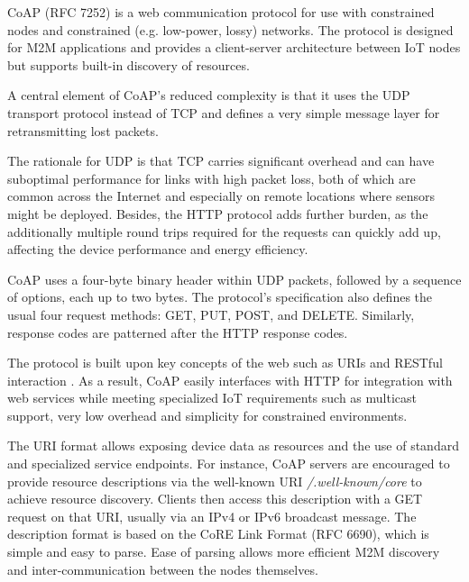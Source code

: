 CoAP \cite{bormann2012coap} (RFC 7252) is a web communication protocol for use with constrained nodes and constrained (e.g. low-power, lossy) networks. The protocol is designed for M2M applications and provides a client-server architecture between IoT nodes but supports built-in discovery of resources.

A central element of CoAP's reduced complexity is that it uses the UDP transport protocol instead of TCP and defines a very simple message layer for retransmitting lost packets. {\color{red}
The rationale for UDP is that TCP carries significant overhead and can have suboptimal performance for links with high packet loss, both of which are common across the Internet \cite{nygren2010akamai} and especially on remote locations where sensors might be deployed. Besides, the HTTP protocol adds further burden, as the additionally multiple round trips required for the requests can quickly add up, affecting the device performance and energy efficiency.

CoAP uses a four-byte binary header within UDP packets, followed by a sequence of options, each up to two bytes. The protocol's specification also defines the usual four request methods: GET, PUT, POST, and DELETE. Similarly, response codes are patterned after the HTTP response codes.
}

The protocol is built upon key concepts of the web such as URIs and RESTful interaction \cite{pereira2013enabling}. As a result, CoAP easily interfaces with HTTP for integration with web services while meeting specialized IoT requirements such as multicast support, very low overhead and simplicity for constrained environments. 

The URI format allows exposing device data as resources and the use of standard and specialized service endpoints. For instance, CoAP servers are encouraged to provide resource descriptions via the well-known URI \emph{/.well-known/core} to achieve resource discovery. Clients then access this description with a GET request on that URI, usually via an IPv4 or IPv6 broadcast message. The description format is based on the CoRE Link Format (RFC 6690), which is simple and easy to parse. Ease of parsing allows more efficient M2M discovery and inter-communication between the nodes themselves.


